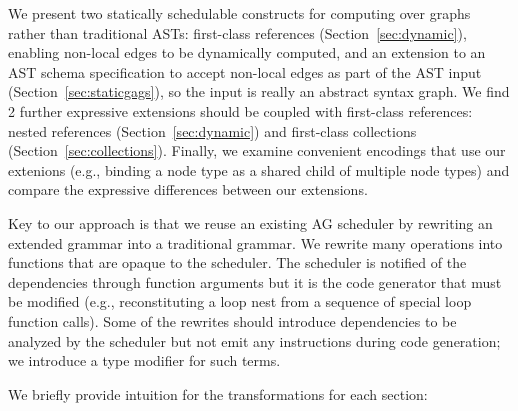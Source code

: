 We present two statically schedulable constructs for computing over graphs rather than traditional ASTs: first-class references (Section~\ref{sec:dynamic}), enabling non-local edges to be dynamically computed, and an extension to an AST schema specification to accept non-local edges as part of the AST input (Section~\ref{sec:staticgags}), so the input is really an abstract syntax graph. We find 2 further expressive extensions should be coupled with first-class references: nested references (Section~\ref{sec:dynamic}) and first-class collections (Section~\ref{sec:collections}). Finally, we examine convenient encodings that use our extenions  (e.g., binding a node type as a shared child of multiple node types) and compare the expressive differences between our extensions.

Key to our approach is that we reuse an existing AG scheduler by rewriting an extended grammar into a traditional grammar. We rewrite many operations into  functions that are opaque to the scheduler. The scheduler is notified of the dependencies through function arguments but it is the code generator that must be modified (e.g., reconstituting a loop nest from a sequence of special loop function calls). Some of the rewrites should introduce dependencies to be analyzed by the scheduler but not emit any instructions during code generation; we introduce a  type modifier for such terms.

We briefly provide intuition for the transformations for each section:

